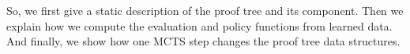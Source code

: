 \documentclass[runningheads,a4paper,draft]{svjour3}
\begin{document}
So, we first give a static description of the proof tree and its component.
Then we explain how we compute the evaluation and policy functions from learned 
data. And finally, we show how one MCTS step changes the proof tree data 
structures.








\end{document}
